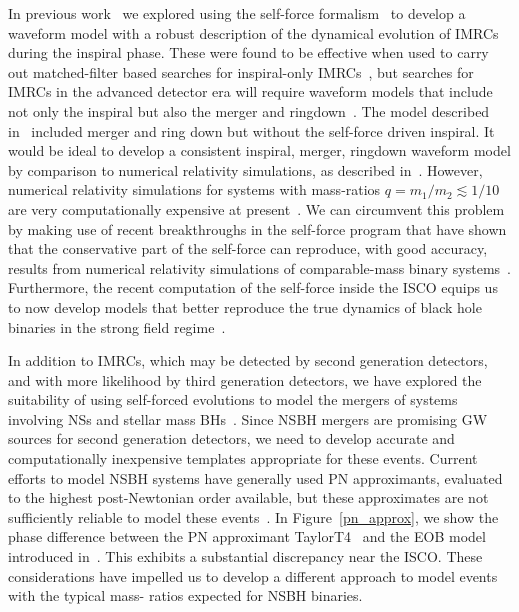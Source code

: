 In previous work~\cite{Huerta:2012zy}%
we explored using the self-force formalism~\cite{SFB,LRP} to develop a waveform model with a robust description of the dynamical evolution of IMRCs during the inspiral phase. These were found to be effective when used to carry out matched-filter based searches for inspiral-only IMRCs~\cite{Smith:2013}, but searches for IMRCs in the advanced detector era will require waveform models that include not only the inspiral but also the merger and ringdown~\cite{Smith:2013}. The model described in~\cite{Huerta:2011a} included merger and ring down but without the self-force driven inspiral. It would be ideal to develop a consistent inspiral, merger, ringdown waveform model by comparison to numerical relativity simulations, as described in~\cite{BuonannoEOBv2Main,Damour:2013}. However, numerical relativity simulations for systems with mass-ratios \(q=m_1/m_2 \lesssim 1/10\) are very computationally expensive at present~\cite{Mroue:2013xna}. We can circumvent 
this problem by 
making use of recent breakthroughs in the self-force program that have shown that the conservative part of the self-force can reproduce, with good accuracy, results from numerical relativity simulations of comparable-mass binary systems~\cite{LeTiec:2012}.   Furthermore, the recent computation of the self-force inside the ISCO equips us to now develop models that better reproduce the true dynamics of black hole binaries in the strong field regime~\cite{Akcay:2012}.  

In addition to IMRCs, which may be detected by second generation detectors, and with more likelihood by third generation detectors, we have explored the suitability of using self-forced evolutions to model the mergers of systems involving NSs and stellar mass BHs~\cite{LVCT}. Since NSBH mergers are promising GW sources for second generation detectors, we need to develop accurate and computationally inexpensive templates appropriate for these events. Current efforts to model NSBH systems have generally used PN approximants, evaluated to the highest post-Newtonian order available, but these approximates are not sufficiently reliable to model these events~\cite{pnbuo,Nitz:2013mxa}. In Figure~\ref{pn_approx}, we show the phase difference between the PN approximant TaylorT4~\cite{TaylorT4Origin} and the EOB model introduced in~\cite{BuonannoEOBv2Main, Damour:2013}. This exhibits a substantial discrepancy near the ISCO. These considerations have impelled us to develop a different approach to model events with the 
typical mass-
ratios expected for NSBH binaries. 


